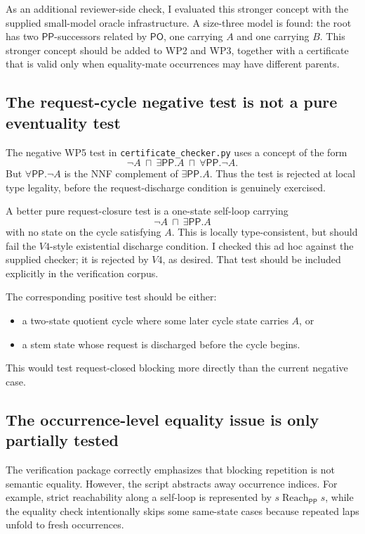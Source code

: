 \documentclass[11pt]{article}
\newcommand{\PP}{\mathsf{PP}}
\newcommand{\PO}{\mathsf{PO}}
\newcommand{\Reach}{\operatorname{Reach}}
\begin{document}
As an additional reviewer-side check, I evaluated this stronger concept with the supplied small-model oracle infrastructure.  A size-three model is found: the root has two \(\PP\)-successors related by \(\PO\), one carrying \(A\) and one carrying \(B\).  This stronger concept should be added to WP2 and WP3, together with a certificate that is valid only when equality-mate occurrences may have different parents.

\subsection{The request-cycle negative test is not a pure eventuality test}

The negative WP5 test in \texttt{certificate\_checker.py} uses a concept of the form
\[
\neg A\ \sqcap\ \exists\PP.A\ \sqcap\ \forall\PP.\neg A.
\]
But \(\forall\PP.\neg A\) is the NNF complement of \(\exists\PP.A\).  Thus the test is rejected at local type legality, before the request-discharge condition is genuinely exercised.

A better pure request-closure test is a one-state self-loop carrying
\[
\neg A\ \sqcap\ \exists\PP.A
\]
with no state on the cycle satisfying \(A\).  This is locally type-consistent, but should fail the \(V4\)-style existential discharge condition.  I checked this ad hoc against the supplied checker; it is rejected by \(V4\), as desired.  That test should be included explicitly in the verification corpus.

The corresponding positive test should be either:
\begin{itemize}
\item a two-state quotient cycle where some later cycle state carries \(A\), or
\item a stem state whose request is discharged before the cycle begins.
\end{itemize}
This would test request-closed blocking more directly than the current negative case.

\subsection{The occurrence-level equality issue is only partially tested}

The verification package correctly emphasizes that blocking repetition is not semantic equality.  However, the script abstracts away occurrence indices.  For example, strict reachability along a self-loop is represented by \(s\Reach_{\PP}s\), while the equality check intentionally skips some same-state cases because repeated laps unfold to fresh occurrences.
\end{document}
